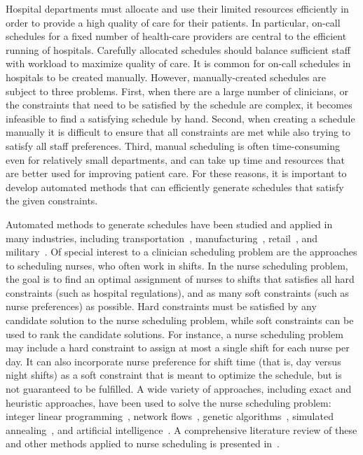 Hospital departments must allocate and use their limited resources efficiently
in order to provide a high quality of care for their patients.
In particular, on-call schedules for
a fixed number of health-care providers are central to the efficient running of
hospitals. Carefully allocated schedules should balance
sufficient staff with workload
to maximize quality of care. It is common for on-call schedules in
hospitals to be created manually. However,
manually-created schedules are subject to three problems.
First, when there are a large number of clinicians,
or the constraints that need to be satisfied
by the schedule are complex, it becomes infeasible
to find a satisfying schedule by hand. 
Second, when creating a schedule manually it is difficult to ensure
that all constraints are met while also trying to satisfy all staff
preferences.
Third, manual scheduling is often time-consuming even for relatively small 
departments, and can take up time and resources that are better used
for improving patient care.
For these reasons, it is important to develop automated methods that
can efficiently generate schedules that satisfy the given constraints.

Automated methods to generate schedules have been studied and applied in many
industries, including
transportation~\cite{aickelin_improved_2006, goel_truck_2012, gunther_combined_2010},
manufacturing~\cite{al-yakoob_mixed-integer_2007, al-yakoob_column_2008, alfares_simulation_2007},
retail~\cite{chapados_retail_2011, nissen_automatic_2010}, and
military~\cite{horn_scheduling_2007, laguna_modeling_2005}.
Of special interest to a clinician scheduling
problem are the approaches to scheduling nurses, who often work in shifts. In the
nurse scheduling problem, the goal is to find an optimal assignment of nurses to
shifts that satisfies all hard constraints (such as hospital regulations),
and as many soft constraints (such as nurse preferences) as possible.
Hard constraints must be satisfied by any candidate solution to the nurse scheduling problem,
while soft constraints can be used to rank the candidate solutions. 
For instance, a nurse scheduling problem may include a hard constraint to assign
at most a single shift for each nurse per day. It can also incorporate 
nurse preference for shift time (that is, day versus night shifts) as a soft constraint
that is meant to optimize the schedule, but is not guaranteed to be fulfilled.
A wide variety of approaches, including exact and heuristic approaches, have been
used to solve the nurse scheduling problem:
integer linear programming~\cite{azaiez_0-1_2005, trilling_nurse_2006, widyastiti_nurses_2016},
network flows~\cite{el_adoly_new_2018},
genetic algorithms~\cite{aickelin_exploiting_2000, jan_evolutionary_2000, kawanaka_genetic_2001},
simulated annealing~\cite{jaszkiewicz_metaheuristic_1997}, and
artificial intelligence~\cite{abdennadher_nurse_1999, li_hybrid_2003}.
A comprehensive
literature review of these and other methods applied to nurse scheduling is
presented in~\cite{burke_state_2004}.

